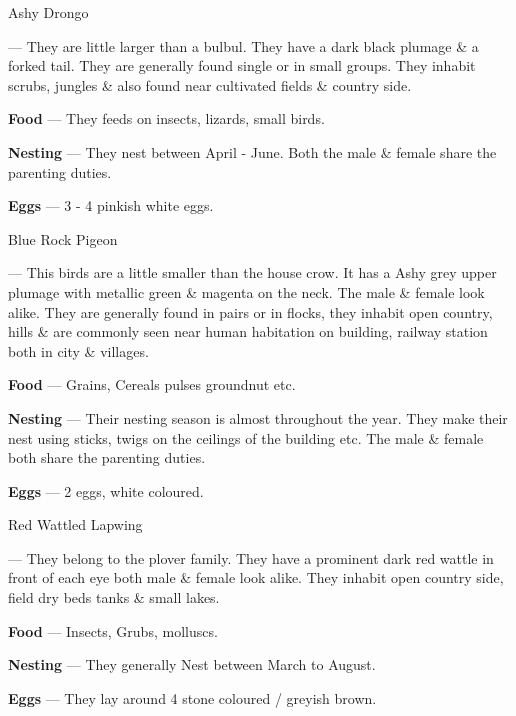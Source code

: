 \begin{bird}{Ashy Drongo}

 --- They are little larger than a bulbul. They have a dark black plumage \& a forked tail. They are generally found single or in small groups. They inhabit scrubs, jungles \& also found near cultivated fields \& country side.

{\large\bf Food} --- They feeds on insects, lizards, small birds.

{\large\bf Nesting} --- They nest between April - June. Both the male \& female share the parenting duties.

{\large\bf Eggs} --- 3 - 4 pinkish white eggs.
\end{bird}

\newpage

\begin{bird}{Blue Rock Pigeon}

 --- This birds are a little smaller than the house crow. It has a Ashy grey upper plumage with metallic green \& magenta on the neck. The male \& female look alike. They are generally found in pairs or in flocks, they inhabit open country, hills \& are commonly seen near human habitation on building, railway station both in city \& villages.

{\large\bf Food} --- Grains, Cereals pulses groundnut etc.

{\large\bf Nesting} --- Their nesting season is almost throughout the year. They make their nest using sticks, twigs on the ceilings of the building etc. The male \& female both share the parenting duties.

{\large\bf Eggs} --- 2 eggs, white coloured.
\end{bird}

\begin{bird}{Red Wattled Lapwing}

 --- They belong to the plover family. They have a prominent dark red wattle in front of each eye both male \& female look alike. They inhabit open country side, field dry beds tanks \& small lakes.

{\large\bf Food} --- Insects, Grubs, molluscs.

{\large\bf Nesting} --- They generally Nest between March to August.

{\large\bf Eggs} --- They lay around 4 stone coloured / greyish brown.
\end{bird}

